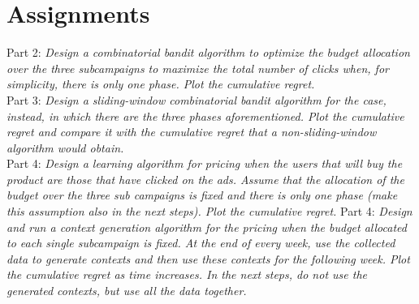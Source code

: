\chapter{Assignments}

Part 2:
\textit{Design a combinatorial bandit algorithm to optimize the budget allocation over the three subcampaigns to maximize the total number of clicks when, for simplicity, there is only one phase. Plot the cumulative regret.}
\label{assPart2}\\

Part 3:
\textit{Design a sliding-window combinatorial bandit algorithm for the case, instead, in which there are the three phases aforementioned. Plot the cumulative regret and compare it with the cumulative regret that a non-sliding-window algorithm would obtain.}
\label{assPart3}\\

Part 4:
\textit{Design a learning algorithm for pricing when the users that will buy the product are those that have clicked on the ads. Assume that the allocation of the budget over the three sub campaigns is fixed and there is only one phase (make this assumption also in the next steps). Plot the cumulative regret.}\label{assPart4}
Part 4:
\textit{Design and run a context generation algorithm for the pricing when the budget allocated to each single subcampaign is fixed. At the end of every week, use the collected data to generate contexts and then use these contexts for the following week. Plot the cumulative regret as time increases. In the next steps, do not use the generated contexts, but use all the data together.}
\label{assPart5}\\